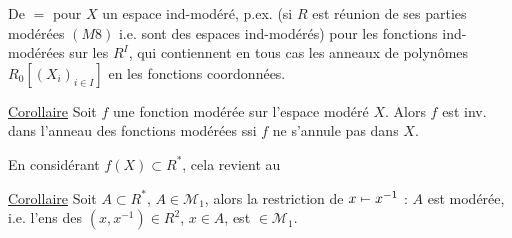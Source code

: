 De $=$ pour $X$ un espace ind-modéré, p.ex. (si $R$ est réunion  de ses parties modérées $(M8)$ i.e.  sont des espaces ind-modérés) pour les fonctions ind-modérées sur les $R^I$, qui contiennent en tous cas les  anneaux de polynômes $R_0[(X_i)_{i\in I}]$ en les fonctions coordonnées.


\uline{Corollaire} Soit $f$ une fonction modérée sur l'espace modéré $X$. Alors $f$ est inv. dans l'anneau des fonctions modérées ssi $f$ ne s'annule pas dans $X$.

En considérant $f(X)\subset R^*$, cela revient au

\uline{Corollaire} Soit $A\subset R^*$, $A\in\mathcal M_1$, alors la restriction de $x\mathrel{\mapstochar\relbar}x^{-1}$ : $A$ est modérée, i.e. l'ens des $(x,x^{-1})\in R^2$, $x\in A$, est $\in\mathcal M_1$.
